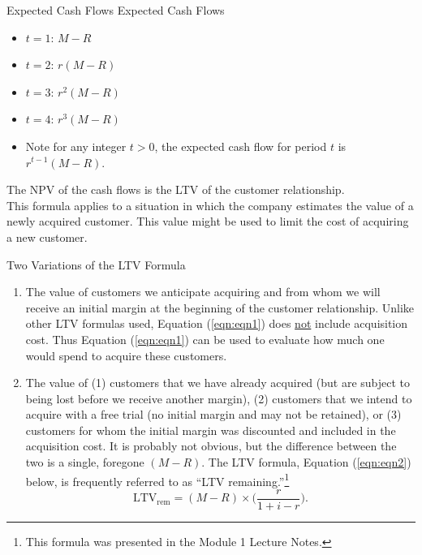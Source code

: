\documentclass[pdf]{beamer}
\theoremstyle{remark}
\theoremstyle{definition}
\begin{document}
\begin{frame}[t]{Expected Cash Flows}
Expected Cash Flows
\begin{itemize}
  \item $t=1$:  $M-R$
  \item $t=2$:  $r(M-R)$
  \item $t=3$:  $r^2(M-R)$
  \item $t=4$:  $r^3(M-R)$
  \item Note for any integer $t > 0$, the expected cash flow for period $t$ is $r^{t-1}(M-R)$. 
\end{itemize}
The NPV of the cash flows is the LTV of the customer relationship. \\
\vspace{1.5ex}
This formula applies to a situation in which the company estimates the value of a newly acquired customer. This value might be used to limit the cost of acquiring a new customer.
\end{frame}

\begin{frame}[t]{Two Variations of the LTV Formula}
\small
\begin{enumerate}
  \item The value of customers we anticipate acquiring and from whom we will receive an initial margin at the beginning of the customer relationship. Unlike other LTV formulas used, Equation (\ref{eqn:eqn1}) does \underline{not} include acquisition cost. Thus  Equation (\ref{eqn:eqn1}) can be used to evaluate how much one would spend to acquire these customers.
  \item The value of (1) customers that we have already acquired (but are subject to being lost before we receive another margin), (2) customers that we intend to acquire with a free trial (no initial margin and may not be retained), or (3) customers for whom the initial margin was discounted and included in the acquisition cost. It is probably not obvious, but the difference between the two is a single, foregone $(M - R)$. The LTV formula, Equation (\ref{eqn:eqn2}) below, is frequently referred to as ``LTV remaining.''\footnote{This formula was presented in the Module 1 Lecture Notes.}
  \begin{equation} \label{eqn:eqn2}
   \text{LTV}_\text{rem} = (M - R) \times \bigg( \frac{r}{1+i-r} \bigg).
  \end{equation}
\end{enumerate}
\end{frame}
\end{document}
